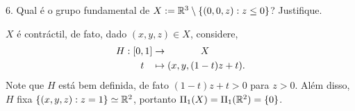 6. Qual é o grupo fundamental de \(X := \mathbb{R}^3 \setminus \{(0,0,z) : z\leq 0\}\)? Justifique. 

\textcolor{gris}{\(X\) é contráctil, de fato, dado \((x,y,z)\in X\), considere, 
\begin{align*}
  H: [0,1] &\to \hspace{1.2cm}X \\ 
   t \hspace{0.3cm}&\mapsto (x,y,(1-t)z + t). 
\end{align*}
Note que \(H\) está bem definida, de fato \((1-t)z + t> 0\) para \(z>0\). Além disso, \(H\) fixa \(\{(x,y,z) : z=1\} \simeq \mathbb{R}^2\), portanto \(\Pi_1(X) = \Pi_1(\mathbb{R}^2) = \{0\}\).  
}